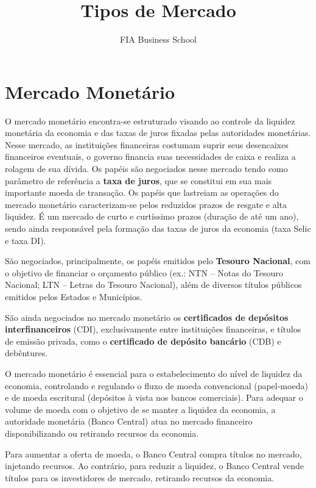 \documentclass{article}\usepackage[]{graphicx}\usepackage[]{xcolor}
\title{Tipos de Mercado}
\author{FIA Business School}
\begin{document}
\maketitle

\section*{Mercado Monetário}

O mercado monetário encontra-se estruturado visando ao controle da liquidez monetária da economia 
e das taxas de juros fixadas pelas autoridades monetárias. Nesse mercado, as instituições 
financeiras costumam suprir seus desencaixes financeiros eventuais, o governo financia suas 
necessidades de caixa e realiza a rolagem de sua dívida. Os papéis são negociados nesse mercado 
tendo como parâmetro de referência a \textbf{taxa de juros}, que se constitui em sua mais importante moeda 
de transação. Os papéis que lastreiam as operações do mercado monetário caracterizam-se pelos 
reduzidos prazos de resgate e alta liquidez. É um mercado de curto e curtíssimo prazos (duração de 
até um ano), sendo ainda responsável pela formação das taxas de juros da economia (taxa Selic e taxa DI).\par

São negociados, principalmente, os papéis emitidos pelo \textbf{Tesouro Nacional}, com o objetivo de 
financiar o orçamento público (ex.: NTN – Notas do Tesouro Nacional; LTN – Letras do Tesouro 
Nacional), além de diversos títulos públicos emitidos pelos Estados e Municípios.\par

São ainda negociados no mercado monetário os \textbf{certificados de depósitos interfinanceiros} (CDI), 
exclusivamente entre instituições financeiras, e títulos de emissão privada, como o \textbf{certificado 
de depósito bancário} (CDB) e debêntures.\par

O mercado monetário é essencial para o estabelecimento do nível de liquidez da economia, 
controlando e regulando o fluxo de moeda convencional (papel-moeda) e de moeda escritural 
(depósitos à vista nos bancos comerciais). Para adequar o volume de moeda com o objetivo de se 
manter a liquidez da economia, a autoridade monetária (Banco Central) atua no mercado financeiro 
disponibilizando ou retirando recursos da economia.\par

Para aumentar a oferta de moeda, o Banco Central compra títulos no mercado, injetando recursos. 
Ao contrário, para reduzir a liquidez, o Banco Central vende títulos para os investidores de 
mercado, retirando recursos da economia.\par
\end{document}
